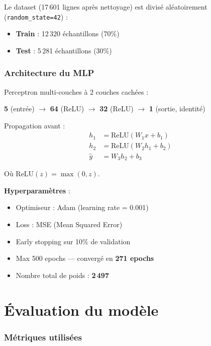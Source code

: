\documentclass[a4paper,11pt]{article}
\begin{document}
Le dataset (17\,601 lignes apr\`es nettoyage) est divis\'e al\'eatoirement (\texttt{random\_state=42}) :

\begin{itemize}
    \item \textbf{Train} : 12\,320 \'echantillons (70\%)
    \item \textbf{Test} : 5\,281 \'echantillons (30\%)
\end{itemize}

\section{Architecture du MLP}

Perceptron multi-couches \`a 2 couches cach\'ees :

\begin{center}
\textbf{5} (entr\'ee) $\to$ \textbf{64} (ReLU) $\to$ \textbf{32} (ReLU) $\to$ \textbf{1} (sortie, identit\'e)
\end{center}

Propagation avant :
\begin{align}
h_1 &= \text{ReLU}(W_1 x + b_1) \\
h_2 &= \text{ReLU}(W_2 h_1 + b_2) \\
\hat{y} &= W_3 h_2 + b_3
\end{align}

O\`u $\text{ReLU}(z) = \max(0, z)$.

\textbf{Hyperparam\`etres} :
\begin{itemize}
    \item Optimiseur : Adam (learning rate = 0.001)
    \item Loss : MSE (Mean Squared Error)
    \item Early stopping sur 10\% de validation
    \item Max 500 epochs --- converg\'e en \textbf{271 epochs}
    \item Nombre total de poids : \textbf{2\,497}
\end{itemize}

\part{\'Evaluation du mod\`ele}

\section{M\'etriques utilis\'ees}
\end{document}
